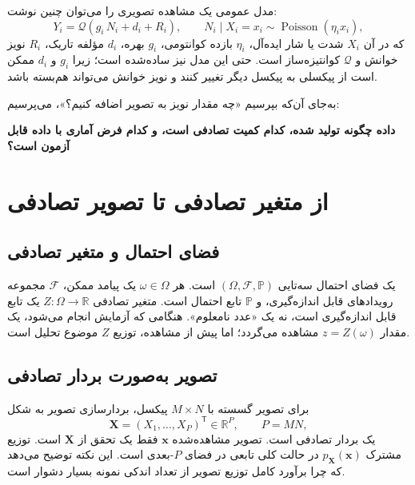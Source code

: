 \documentclass[12pt,openany,oneside]{book}
\newcommand{\R}{\mathbb{R}}
\newcommand{\Prob}{\mathbb{P}}
\newcommand{\trans}{^{\mathsf T}}
\newcommand{\vect}[1]{\bm{#1}}
\newcommand{\Poisson}{\operatorname{Poisson}}
\begin{document}
مدل عمومی یک مشاهده تصویری را می‌توان چنین نوشت:
\begin{equation}
Y_i = \mathcal Q\!\left(g_i\,N_i + d_i + R_i\right),
\qquad
N_i\mid X_i=x_i\sim\Poisson(\eta_i x_i),
\label{eq:general-sensor}
\end{equation}
که در آن \(X_i\) شدت یا شار ایده‌آل، \(\eta_i\) بازده کوانتومی، \(g_i\) بهره، \(d_i\) مؤلفه تاریک،
\(R_i\) نویز خوانش و \(\mathcal Q\) کوانتیزه‌ساز است. حتی این مدل نیز ساده‌شده است؛ زیرا
\(g_i\) و \(d_i\) ممکن است از پیکسلی به پیکسل دیگر تغییر کنند و نویز خوانش می‌تواند هم‌بسته باشد.

\begin{keybox}
به‌جای آن‌که بپرسیم «چه مقدار نویز به تصویر اضافه کنیم؟»، می‌پرسیم:
\begin{center}
\bfseries داده چگونه تولید شده، کدام کمیت تصادفی است، و کدام فرض آماری با داده قابل آزمون است؟
\end{center}
\end{keybox}

\section{از متغیر تصادفی تا تصویر تصادفی}

\subsection{فضای احتمال و متغیر تصادفی}

یک فضای احتمال سه‌تایی \((\Omega,\mathcal F,\Prob)\) است. هر \(\omega\in\Omega\) یک پیامد ممکن،
\(\mathcal F\) مجموعه رویدادهای قابل اندازه‌گیری، و \(\Prob\) تابع احتمال است. متغیر تصادفی
\(Z:\Omega\to\R\) یک تابع قابل اندازه‌گیری است، نه یک «عدد نامعلوم». هنگامی که آزمایش انجام می‌شود،
یک مقدار \(z=Z(\omega)\) مشاهده می‌گردد؛ اما پیش از مشاهده، توزیع \(Z\) موضوع تحلیل است.

\subsection{تصویر به‌صورت بردار تصادفی}

برای تصویر گسسته با \(M\times N\) پیکسل، بردارسازی تصویر به شکل
\begin{equation}
\vect{X}=(X_1,\ldots,X_P)\trans\in\R^P,
\qquad P=MN,
\end{equation}
یک بردار تصادفی است. تصویر مشاهده‌شده \(\vect{x}\) فقط یک تحقق از \(\vect{X}\) است. توزیع مشترک
\(p_{\vect{X}}(\vect{x})\) در حالت کلی تابعی در فضای \(P\)-بعدی است. این نکته توضیح می‌دهد که چرا
برآورد کامل توزیع تصویر از تعداد اندکی نمونه بسیار دشوار است.
\end{document}
